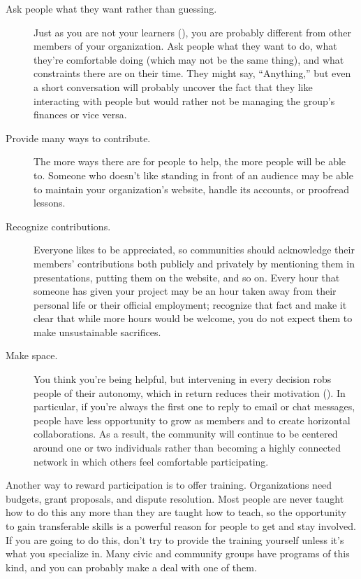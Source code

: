 \begin{description}

\item[Ask people what they want rather than guessing.]
  Just as you are not your learners (),
  you are probably different from other members of your organization.
  Ask people what they want to do,
  what they're comfortable doing (which may not be the same thing),
  and what constraints there are on their time.
  They might say, ``Anything,''
  but even a short conversation will probably uncover the fact that
  they like interacting with people but would rather not be managing the group's finances
  or vice versa.

\item[Provide many ways to contribute.]
  The more ways there are for people to help,
  the more people will be able to.
  Someone who doesn't like standing in front of an audience
  may be able to maintain your organization's website,
  handle its accounts,
  or proofread lessons.

\item[Recognize contributions.]
  Everyone likes to be appreciated,
  so communities should acknowledge
  their members' contributions both publicly and privately
  by mentioning them in presentations,
  putting them on the website,
  and so on.
  Every hour that someone has given your project
  may be an hour taken away from their personal life or their official employment;
  recognize that fact
  and make it clear that while more hours would be welcome,
  you do not expect them to make unsustainable sacrifices.

\item[Make space.]
  You think you're being helpful,
  but intervening in every decision robs people of their autonomy,
  which in return reduces their motivation ().
  In particular,
  if you're always the first one to reply to email or chat messages,
  people have less opportunity to grow as members
  and to create horizontal collaborations.
  As a result,
  the community will continue to be centered around one or two individuals
  rather than becoming a highly connected network
  in which others feel comfortable participating.

\end{description}

Another way to reward participation is to offer training.
Organizations need budgets, grant proposals, and dispute resolution.
Most people are never taught how to do this any more than they are taught how to teach,
so the opportunity to gain transferable skills
is a powerful reason for people to get and stay involved.
If you are going to do this,
don't try to provide the training yourself
unless it's what you specialize in.
Many civic and community groups have programs of this kind,
and you can probably make a deal with one of them.

